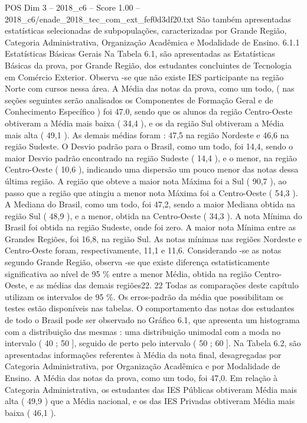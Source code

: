 \begin{textsample}{POS Dim 3 – 2018\_c6 – Score 1.00 – 2018\_c6/enade\_2018\_tec\_com\_ext\_fef0d3df20.txt}
São também apresentadas estatísticas selecionadas de subpopulações, caracterizadas por Grande Região, Categoria Administrativa, Organização Acadêmica e Modalidade de Ensino. 6.1.1 Estatísticas Básicas Gerais Na Tabela 6.1, são apresentadas as Estatísticas Básicas da prova, por Grande Região, dos estudantes concluintes de Tecnologia em Comércio Exterior.
Observa -se que não existe IES participante na região Norte com cursos nessa área.
A Média das notas da prova, como um todo, ( nas seções seguintes serão analisados os Componentes de Formação Geral e de Conhecimento Específico ) foi 47.0, sendo que os alunos da região Centro-Oeste obtiveram a Média mais baixa ( 34,4 ), e os da região Sul obtiveram a Média mais alta ( 49,1 ).
As demais médias foram : 47,5 na região Nordeste e 46,6 na região Sudeste.
O Desvio padrão para o Brasil, como um todo, foi 14,4, sendo o maior Desvio padrão encontrado na região Sudeste ( 14,4 ), e o menor, na região Centro-Oeste ( 10,6 ), indicando uma dispersão um pouco menor das notas dessa última região.
A região que obteve a maior nota Máxima foi a Sul ( 90,7 ), ao passo que a região que atingiu a menor nota Máxima foi a Centro-Oeste ( 54,3 ).
A Mediana do Brasil, como um todo, foi 47,2, sendo a maior Mediana obtida na região Sul ( 48,9 ), e a menor, obtida na Centro-Oeste ( 34,3 ).
A nota Mínima do Brasil foi obtida na região Sudeste, onde foi zero.
A maior nota Mínima entre as Grandes Regiões, foi 16,8, na região Sul.
As notas mínimas nas regiões Nordeste e Centro-Oeste foram, respectivamente, 11,1 e 11,6.
Considerando -se as notas segundo Grande Região, observa -se que existe diferença estatisticamente significativa ao nível de 95 \% entre a menor Média, obtida na região Centro-Oeste, e as médias das demais regiões22. 22 Todas as comparações deste capítulo utilizam os intervalos de 95 \%.
Os erros-padrão da média que possibilitam os testes estão disponíveis nas tabelas.
O comportamento das notas dos estudantes de todo o Brasil pode ser observado no Gráfico 6.1, que apresenta um histograma com a distribuição das mesmas : uma distribuição unimodal com a moda no intervalo ( 40 ; 50 ], seguido de perto pelo intervalo ( 50 ; 60 ].
Na Tabela 6.2, são apresentadas informações referentes à Média da nota final, desagregadas por Categoria Administrativa, por Organização Acadêmica e por Modalidade de Ensino.
A Média das notas da prova, como um todo, foi 47,0.
Em relação à Categoria Administrativa, os estudantes das IES Públicas obtiveram Média mais alta ( 49,9 ) que a Média nacional, e os das IES Privadas obtiveram Média mais baixa ( 46,1 ).

\end{textsample}
